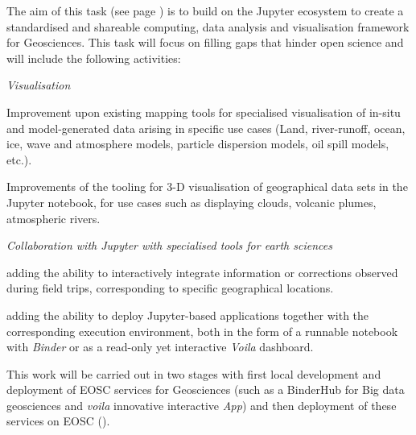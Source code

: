 \begin{task}[
  title=Demonstrator: Geosciences,
  id=geoscience,
  lead=UIO,
  PM=22,
  partners={QS,SRL}
]


The aim of this task (see page \pageref{sec:concept-demonstrators-geo}) is to build on the Jupyter ecosystem to create a standardised and shareable computing, data analysis and visualisation framework for Geosciences. This task will focus on filling gaps that hinder open science and will include the following activities:

\emph{Visualisation}

\begin{compactitem}
  \item Improvement upon existing mapping tools for specialised
    visualisation of in-situ and model-generated data arising in
    specific use cases (Land, river-runoff, ocean, ice, wave and
    atmosphere models, particle dispersion models, oil spill models,
    etc.).

  \item Improvements of the tooling for 3-D visualisation of
    geographical data sets in the Jupyter notebook, for use cases such as
    displaying clouds, volcanic plumes, atmospheric rivers.
\end{compactitem}

\emph{Collaboration with Jupyter with specialised tools for earth sciences}

\begin{compactitem}
  \item adding the ability to interactively integrate information or corrections
    observed during field trips, corresponding to specific geographical locations.


  \item adding the ability to deploy Jupyter-based applications together with
    the corresponding execution environment, both in the form of a runnable
    notebook with \emph{Binder} or as a read-only yet interactive \emph{Voila}
    dashboard.
\end{compactitem}

This work will be carried out in two stages with first local development and deployment of \TheProject EOSC services for Geosciences 
(such as a BinderHub for Big data geosciences and \emph{voila} innovative interactive \emph{App}) and then deployment of these services on EOSC ().
\end{task}

